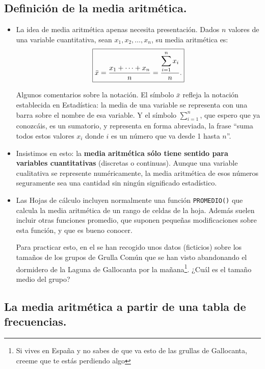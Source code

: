 \subsection{Definición de la media aritmética.}
\begin{itemize}
    \item La idea de media aritmética apenas necesita presentación. Dados $n$ valores de una {\sf variable cuantitativa}, sean $x_1,x_2,\ldots,x_n$, su {\sf media aritmética} es:
        \[\fbox{$\bar x=\dfrac{x_1+\cdots+x_n}{n}=\dfrac{\displaystyle\sum_{i=1}^nx_i}{n}.$}\]

        Algunos comentarios sobre la notación. El símbolo $\bar x$ refleja la notación establecida en Estadística: la media de una variable se representa con una barra sobre el nombre de esa variable. Y el símbolo $\displaystyle\sum_{i=1}^n$, que espero que ya conozcáis, es un {\sf sumatorio}, y representa en forma abreviada, la frase ``suma todos estos valores $x_i$ donde $i$ es un número que va desde 1 hasta $n$''.
    \item Insistimos en esto: la {\bf media aritmética sólo tiene sentido para variables cuantitativas} (discretas o continuas). Aunque una variable cualitativa se represente numéricamente, la media
        aritmética de esos números seguramente sea una cantidad sin ningún significado estadístico.
    \item Las Hojas de cálculo incluyen normalmente una función {\tt PROMEDIO()} que calcula la media aritmética de un rango de celdas de la hoja. Además suelen incluir otras funciones promedio, que suponen pequeñas modificaciones sobre esta función, y que es bueno conocer.

        Para practicar esto, en el  se han recogido unos datos (ficticios) sobre los tamaños de los grupos de Grulla Común que se han visto abandonando el dormidero de la Laguna de Gallocanta por la mañana\footnote{Si vives en España y no sabes de que va esto de las grullas de Gallocanta, creeme que te estás perdiendo algo}. ¿Cuál es el tamaño medio del grupo?
\end{itemize}


\subsection{La media aritmética a partir de una tabla de frecuencias.}

